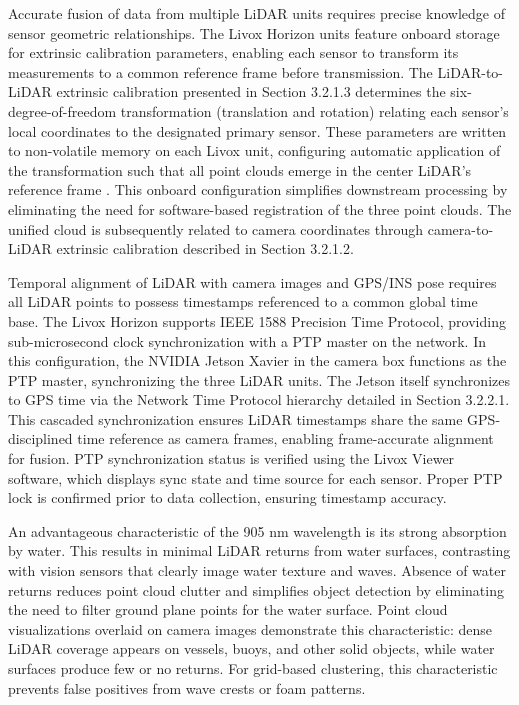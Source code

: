 \documentclass{erauthesis}
\begin{document}
Accurate fusion of data from multiple \ac{LiDAR} units requires precise knowledge of sensor geometric relationships.
The Livox Horizon units feature onboard storage for extrinsic calibration parameters, enabling each sensor to transform its measurements to a common reference frame before transmission.
The \ac{LiDAR}-to-\ac{LiDAR} extrinsic calibration presented in Section 3.2.1.3 determines the six-degree-of-freedom transformation (translation and rotation) relating each sensor's local coordinates to the designated primary sensor.
These parameters are written to non-volatile memory on each Livox unit, configuring automatic application of the transformation such that all point clouds emerge in the center \ac{LiDAR}'s reference frame \cite{thompson2023}.
This onboard configuration simplifies downstream processing by eliminating the need for software-based registration of the three point clouds.
The unified cloud is subsequently related to camera coordinates through camera-to-\ac{LiDAR} extrinsic calibration described in Section 3.2.1.2.

Temporal alignment of \ac{LiDAR} with camera images and \ac{GPS}/\ac{INS} pose requires all \ac{LiDAR} points to possess timestamps referenced to a common global time base.
The Livox Horizon supports IEEE 1588 Precision Time Protocol, providing sub-microsecond clock synchronization with a PTP master on the network.
In this configuration, the NVIDIA Jetson Xavier in the camera box functions as the PTP master, synchronizing the three \ac{LiDAR} units.
The Jetson itself synchronizes to \ac{GPS} time via the Network Time Protocol hierarchy detailed in Section 3.2.2.1.
This cascaded synchronization ensures \ac{LiDAR} timestamps share the same \ac{GPS}-disciplined time reference as camera frames, enabling frame-accurate alignment for fusion.
PTP synchronization status is verified using the Livox Viewer software, which displays sync state and time source for each sensor.
Proper PTP lock is confirmed prior to data collection, ensuring timestamp accuracy.

An advantageous characteristic of the 905 nm wavelength is its strong absorption by water.
This results in minimal \ac{LiDAR} returns from water surfaces, contrasting with vision sensors that clearly image water texture and waves.
Absence of water returns reduces point cloud clutter and simplifies object detection by eliminating the need to filter ground plane points for the water surface.
Point cloud visualizations overlaid on camera images demonstrate this characteristic: dense \ac{LiDAR} coverage appears on vessels, buoys, and other solid objects, while water surfaces produce few or no returns.
For grid-based clustering, this characteristic prevents false positives from wave crests or foam patterns.
\end{document}
